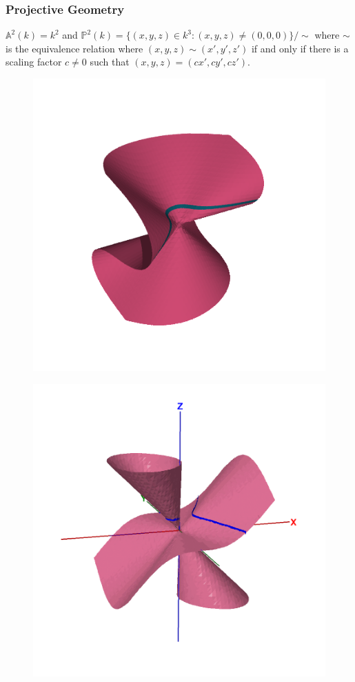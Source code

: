 \documentclass{beamer}
\begin{document}
\begin{frame}
\frametitle{Projective Geometry}
$\mathbb A^2(k) = k^2$ and $\mathbb P^2(k) = \{ (x,y,z) \in k^3 \colon (x,y,z) \neq (0,0,0) \} / \sim$ 
where $\sim$ is the equivalence relation where $(x,y,z) \sim (x',y',z')$ if and only if there 
is a scaling factor $c \neq 0$ such that $(x,y,z) = (cx', cy', cz')$. 
 
\begin{figure}[H]
\begin{minipage}[b]{0.4\linewidth}
\centering
\includegraphics[width=\textwidth]{projective-elliptic-curve}
\label{fig:a}
\end{minipage}
\hspace{0.5cm}
\begin{minipage}[b]{0.4\linewidth}
\centering
\includegraphics[width=\textwidth]{projective-elliptic-curve-2}

\end{minipage}
\end{figure}
\end{frame}
\end{document}
